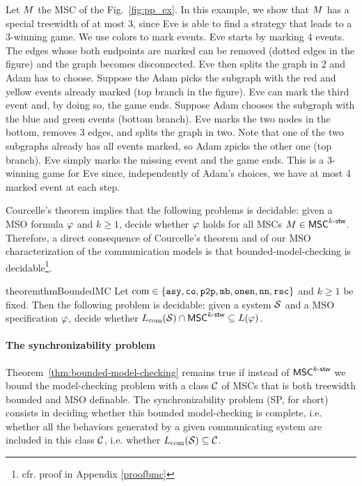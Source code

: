 \begin{example}
	Let $M$ the MSC of the Fig.~\ref{fig:pp_ex}. In this example, we show that $M$ has a special treewidth of at most 3, since Eve is able to find a strategy that leads to a 3-winning game.  We use colors to mark events. Eve starts by marking 4 events. The edges whose both endpoints are marked can be removed (dotted edges in the figure) and the graph becomes disconnected. Eve then splits the graph in 2 and Adam has to choose.
	Suppose the Adam picks the subgraph with the red and yellow events already marked (top branch in the figure). Eve can mark the third event and, by doing so, the game ends.
	Suppose Adam chooses the subgraph with the blue and green events (bottom branch). Eve marks the two nodes in the bottom, removes 3 edges, and splits the graph in two. Note that one of the two subgraphs already has all events marked, so Adam zpicks the other one (top branch).
	Eve simply marks the missing event and the game ends. This is a 3-winning game for Eve since, independently of Adam's choices, we have at most 4 marked event at each step.
\end{example}


Courcelle's theorem implies that the following problems is
decidable: given a MSO formula $\varphi$ and $k\geq 1$,
decide whether $\varphi$ holds for all MSCs $M\in\mathsf{MSC}^{k\textup{-}\mathsf{stw}}$.
Therefore, a direct consequence of Courcelle's theorem and of our MSO characterization
of the communication models is that bounded-model-checking is decidable\footnote{cfr. proof in Appendix \ref{proofbmc}}.

\begin{restatable}{theorem}{thmBoundedMC}\label{thm:bounded-model-checking}
Let $\textup{com}\in\{\mathtt{asy}, \mathtt{co}, \mathtt{p2p}, \mathtt{mb}, \mathtt{onen}, \mathtt{nn}, \mathtt{rsc}\}$ and $k\geq 1$ be fixed.
Then the following problem is decidable: given a system $\mathcal{S}$ and
a MSO specification $\varphi$, decide whether
$L_{\textup{com}}(\mathcal{S})\cap \mathsf{MSC}^{k\textup{-}\mathsf{stw}}\subseteq L(\varphi)$.
\end{restatable}

\paragraph{\bf The synchronizability problem}

Theorem~\ref{thm:bounded-model-checking} remains true if instead of
$\mathsf{MSC}^{k\textup{-}\mathsf{stw}}$ we bound the model-checking problem with
a class $\mathcal{C}$ of MSCs that is both treewidth bounded and MSO definable.
The synchronizability problem (SP, for short) consists in deciding whether this bounded model-checking is complete,
i.e. whether all the behaviors generated by a given communicating system are included in this
class $\mathcal{C}$, i.e. whether
$L_{\textup{com}}(\mathcal{S}) \subseteq \mathcal{C}$.


